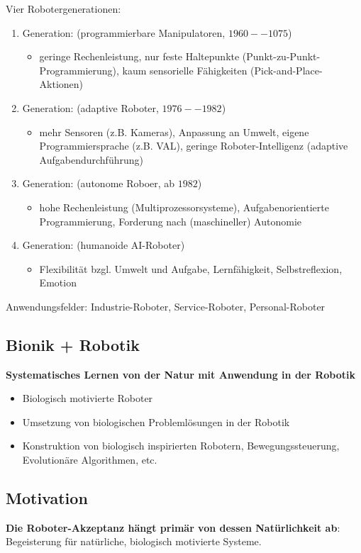 Vier Robotergenerationen:
\begin{enumerate}
	\item Generation: (programmierbare Manipulatoren, $1960--1075$)
	\begin{itemize}
		\item geringe Rechenleistung, nur feste Haltepunkte (Punkt-zu-Punkt-Programmierung), kaum sensorielle Fähigkeiten (Pick-and-Place-Aktionen)
	\end{itemize}
	\item Generation: (adaptive Roboter, $1976--1982$)
	\begin{itemize}
		\item mehr Sensoren (z.B. Kameras), Anpassung an Umwelt, eigene Programmiersprache (z.B. VAL), geringe Roboter-Intelligenz (adaptive Aufgabendurchführung)
	\end{itemize}
	\item Generation: (autonome Roboer, ab $1982$)
	\begin{itemize}
		\item hohe Rechenleistung (Multiprozessorsysteme), Aufgabenorientierte Programmierung, Forderung nach (maschineller) Autonomie
	\end{itemize}
	\item Generation: (humanoide AI-Roboter)
	\begin{itemize}
		\item Flexibilität bzgl. Umwelt und Aufgabe, Lernfähigkeit, Selbstreflexion, Emotion
	\end{itemize}
\end{enumerate}
Anwendungsfelder: Industrie-Roboter, Service-Roboter, Personal-Roboter

\subsection{Bionik + Robotik}
\textbf{Systematisches Lernen von der Natur mit Anwendung in der Robotik}
\begin{itemize}
	\item Biologisch motivierte Roboter
	\item Umsetzung von biologischen Problemlösungen in der Robotik
	\item Konstruktion von biologisch inspirierten Robotern, Bewegungssteuerung, Evolutionäre Algorithmen, etc.\
\end{itemize}

\subsection{Motivation}
\textbf{Die Roboter-Akzeptanz hängt primär von dessen Natürlichkeit ab}: Begeisterung für natürliche, biologisch motivierte Systeme. \\

